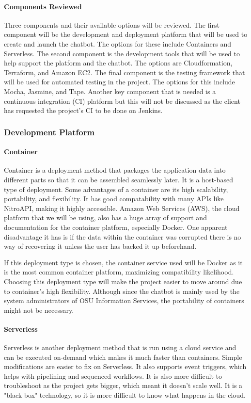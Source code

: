 \paragraph{Components Reviewed}
Three components and their available options will be reviewed.
The first component will be the development and deployment platform that will be used to create and launch the chatbot. 
The options for these include Containers and Serverless.
The second component is the development tools that will be used to help support the platform and the chatbot.
The options are Cloudformation, Terraform, and Amazon EC2.
The final component is the testing framework that will be used for automated testing in the project.
The options for this include Mocha, Jasmine, and Tape.
Another key component that is needed is a continuous integration (CI) platform but this will not be discussed as the client has requested the project's CI to be done on Jenkins. 

\subsubsection{Development Platform}
\paragraph{Container}
Container is a deployment method that packages the application data into different parts so that it can be assembled seamlessly later. 
It is a host-based type of deployment. 
Some advantages of a container are its high scalability, portability, and flexibility.  
It has good compatability with many APIs like NitroAPI, making it highly accessible.
Amazon Web Services (AWS), the cloud platform that we will be using, also has a huge array of support and documentation for the container platform, especially Docker.
One apparent disadvantage it has is if the data within the container was corrupted there is no way of recovering it unless the user has backed it up beforehand.

If this deployment type is chosen, the container service used will be Docker as it is the most common container platform, maximizing compatibility likelihood. 
Choosing this deployment type will make the project easier to move around due to container's high flexibility. 
Although since the chatbot is mainly used by the system administrators of OSU Information Services, the portability of containers might not be necessary.

\paragraph{Serverless}
Serverless is another deployment method that is run using a cloud service and can be executed on-demand which makes it much faster than containers. 
Simple modifications are easier to fix on Serverless. 
It also supports event triggers, which helps with pipelining and sequenced workflows. 
It is also more difficult to troubleshoot as the project gets bigger, which meant it doesn't scale well. 
It is a "black box" technology, so it is more difficult to know what happens in the cloud.

